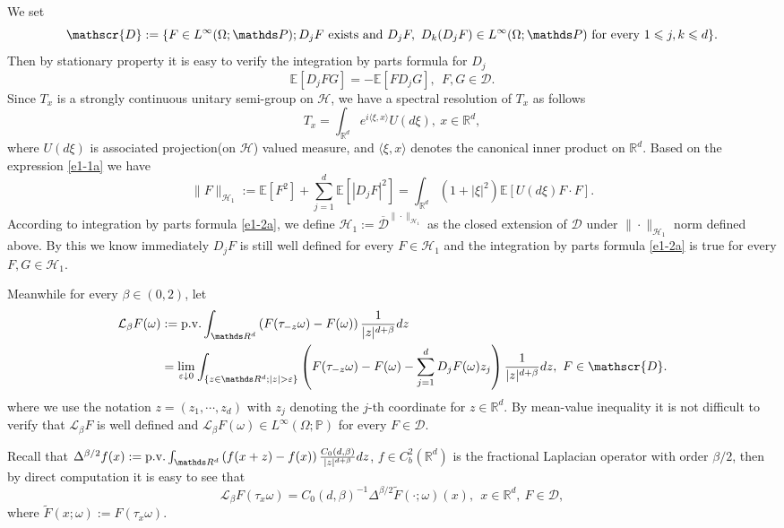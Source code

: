 \documentclass[11pt,draft, reqno]{amsart}
\renewcommand{\le}{\leqslant}
\def\LL{{\mathcal L}}
\newcommand{\D}{\mathscr{D}}
\newcommand{\HH}{\mathcal{H}}
\newcommand{\R}{\mathds R}
\newcommand{\e}{\varepsilon}
\newcommand{\Pp}{\mathds P}
\newcommand{\Ee}{\mathds E}
\newcommand{\w}{\omega}
\theoremstyle{definition}
\numberwithin{equation}{section}
\begin{document}
We set
\begin{equation*}
\D:=\{F\in L^\infty(\Omega;\Pp); D_jF\ {\rm exists\ and}\ D_j F,\ D_k(D_j F)\in L^\infty(\Omega;\Pp)\ {\rm for\ every}\ 1\le j,k \le d\}.
\end{equation*}
Then by stationary property it is easy to verify the integration by parts formula for $D_j$
\begin{equation}\label{e1-2a}
\Ee[D_j F G]=-\Ee[F D_j G],\ \ F,G\in \D.
\end{equation}
Since $T_x$ is a strongly continuous unitary semi-group on $\HH$, we have a spectral resolution of
$T_x$ as follows
\begin{equation}\label{e1-1a}
T_x=\int_{\R^d} e^{i \langle \xi, x\rangle }U(d\xi),\ x\in \R^d,
\end{equation}
where $U(d\xi)$ is associated projection(on $\HH$) valued measure, and
$\langle \xi,x\rangle$ denotes the canonical inner product on $\R^d$. Based on the expression \eqref{e1-1a} we have
\begin{equation*}
\|F\|_{\HH_1}:=\Ee[F^2]+\sum_{j=1}^d \Ee[|D_j F|^2]=\int_{\R^d}\left(1+|\xi|^2\right)\Ee[U(d\xi)F\cdot F].
\end{equation*}
According to integration by parts formula \eqref{e1-2a}, we define $\HH_1:=\overline{\D}^{\|\cdot\|_{\HH_1}}$ as
the closed extension of $\D$ under $\|\cdot\|_{\HH_1}$ norm defined above. By this we know immediately $D_j F$
is still well defined for every $F\in \HH_1$ and the integration by parts formula \eqref{e1-2a} is true for
every $F,G\in \HH_1$.

Meanwhile for every $\beta\in (0,2)$, let
\begin{equation*}
\begin{split}
\LL_\beta F(\w)&:={\rm p.v.}\int_{\R^d}\left(F(\tau_{-z} \w)-F(\w)\right)\frac{1}{|z|^{d+\beta}}dz\\
&=\lim_{\e \downarrow 0}\int_{\{z\in \R^d;|z|>\e\}}\left(F(\tau_{-z} \w)-F(\w)-\sum_{j=1}^d D_jF(\w)z_j\right)\frac{1}{|z|^{d+\beta}}dz,
\ F\in \D.
\end{split}
\end{equation*}
where we use the notation $z=(z_1,\cdots,z_d)$ with $z_j$ denoting the $j$-th coordinate for $z\in \R^d$. By
mean-value inequality it is not difficult to verify that $\LL_\beta F$ is well defined  and $\LL_\beta F(\w)\in L^\infty(\Omega;\Pp)$ for every $F\in \D$.

Recall that $\Delta^{\beta/2}f(x):={\rm p.v.}\int_{\R^d}\left(f(x+z)-f(x)\right)\frac{C_0(d,\beta)}{|z|^{d+\beta}}dz$, $f\in C_b^2(\R^d)$
is the fractional Laplacian operator with order $\beta/2$, then by direct computation it is easy to see that
\begin{equation}\label{e1-3a}
\LL_\beta F(\tau_x \w)=C_0(d,\beta)^{-1}\Delta^{\beta/2}\tilde F(\cdot;\w)(x),\ \ x\in \R^d,\ F \in \D,
\end{equation}
where $\tilde F(x;\w):=F(\tau_x \w)$.
\end{document}
